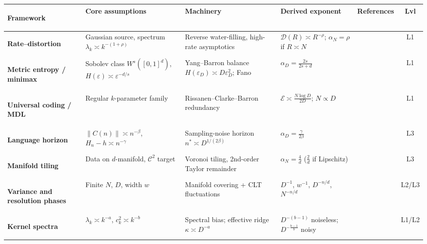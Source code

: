 \documentclass[11pt,a4paper]{article}
\theoremstyle{definition}
\begin{document}
\begin{table}[htbp]
\centering
\scriptsize
\setlength{\tabcolsep}{3pt}
\renewcommand{\arraystretch}{1.35}
\begin{tabularx}{\textwidth}{>{\bfseries\raggedright\arraybackslash}p{2.4cm} >{\raggedright\arraybackslash}p{2.4cm} >{\raggedright\arraybackslash}X >{\raggedright\arraybackslash}p{2.8cm} >{\raggedright\arraybackslash}p{1.6cm} c}
\toprule
\textbf{Framework} & \textbf{Core assumptions} & \textbf{Machinery} & \textbf{Derived exponent} & \textbf{References} & \textbf{Lvl} \\
\midrule
\textbf{Rate--distortion} & Gaussian source, spectrum $\lambda_k\asymp k^{-(1+\rho)}$ & Reverse water-filling, high-rate asymptotics & $\mathcal{D}(R)\asymp R^{-\rho}$; $\alpha_N=\rho$ if $R\asymp N$ & \cite{shannon1948mathematical,berger1971rate} & L1 \\
\midrule
\textbf{Metric entropy / minimax} & Sobolev class $W^s([0,1]^d)$, $H(\varepsilon)\asymp\varepsilon^{-d/s}$ & Yang--Barron balance $H(\varepsilon_D)\asymp D\varepsilon_D^2$; Fano & $\alpha_D = \frac{2s}{2s+d}$ & \cite{yang1999information,tsybakov2009introduction} & L1 \\
\midrule
\textbf{Universal coding / MDL} & Regular $k$-parameter family & Rissanen--Clarke--Barron redundancy & $\mathcal{E}\asymp \frac{N\log D}{2D}$; $N\propto D$ & \cite{rissanen1996fisher,clarke1990information,jeon2024information} & L1 \\
\midrule
\textbf{Language horizon} & $\|C(n)\|\asymp n^{-\beta}$, $H_n - h\asymp n^{-\gamma}$ & Sampling-noise horizon $n^*\asymp D^{1/(2\beta)}$ & $\alpha_D = \frac{\gamma}{2\beta}$ & \cite{cagnetta2026deriving,hilberg1990der,debowski2015relaxed} & L3 \\
\midrule
\textbf{Manifold tiling} & Data on $d$-manifold, $\mathcal{C}^2$ target & Voronoi tiling, 2nd-order Taylor remainder & $\alpha_N = \frac{4}{d}$ ($\frac{2}{d}$ if Lipschitz) & \cite{sharma2020neural} & L3 \\
\midrule
\textbf{Variance and resolution phases} & Finite $N$, $D$, width $w$ & Manifold covering + CLT fluctuations & $D^{-1}$, $w^{-1}$, $D^{-n/d}$, $N^{-n/d}$ & \cite{bahri2024explaining} & L2/L3 \\
\midrule
\textbf{Kernel spectra} & $\lambda_k\asymp k^{-a}$, $c_k^2\asymp k^{-b}$ & Spectral bias; effective ridge $\kappa\asymp D^{-a}$ & $D^{-(b-1)}$ noiseless; $D^{-\frac{b-1}{b}}$ noisy & \cite{bordelon2020spectrum,canatar2021spectral,cui2021generalization,caponnetto2007optimal} & L1/L2 \\

\end{tabularx}
\end{table}
\end{document}
